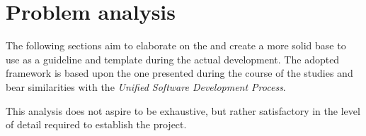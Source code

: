 \chapter{Problem analysis}\label{ch:analysis}

The following sections aim to elaborate on the  and create a more solid base to use as a guideline and template during the actual development.
The adopted framework is based upon the one presented during the course of the studies \cite{up} and bear similarities with the \emph{Unified Software Development Process}.

This analysis does not aspire to be exhaustive, but rather satisfactory in the level of detail required to establish the project.









